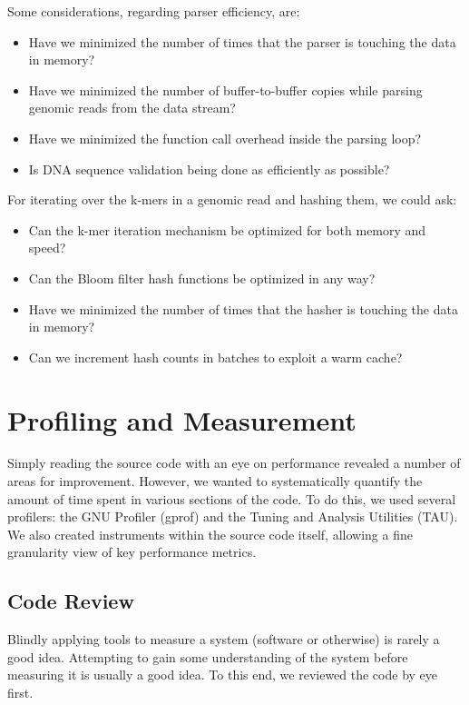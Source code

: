 \documentclass{article}
\begin{document}
Some considerations, regarding parser efficiency, are:
\begin{itemize}
\item Have we minimized the number of times that the parser is touching the data in memory?
\item Have we minimized the number of buffer-to-buffer copies while parsing genomic reads from the data stream?
\item Have we minimized the function call overhead inside the parsing loop?
\item Is DNA sequence validation being done as efficiently as possible?
\end{itemize}

For iterating over the k-mers in a genomic read and hashing them, we could ask:
\begin{itemize}
\item Can the k-mer iteration mechanism be optimized for both memory and speed?
\item Can the Bloom filter hash functions be optimized in any way?
\item Have we minimized the number of times that the hasher is touching the data in memory?
\item Can we increment hash counts in batches to exploit a warm cache?
\end{itemize}

\section{Profiling and Measurement}

Simply reading the source code with an eye on performance revealed a number of areas for improvement. However, we wanted to systematically quantify the amount of time spent in various sections of the code. To do this, we used several profilers: the GNU Profiler (gprof) and the Tuning and Analysis Utilities (TAU). We also created instruments within the source code itself, allowing a fine granularity view of key performance metrics.

\subsection{Code Review}

Blindly applying tools to measure a system (software or otherwise) is rarely a good idea. Attempting to gain some understanding of the system before measuring it is usually a good idea. To this end, we reviewed the code by eye first.
\end{document}
